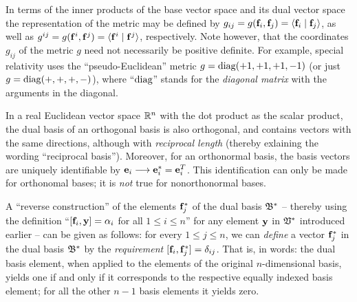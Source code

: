 In terms of the inner products of the base vector space and its dual vector space the representation
of the metric
may be defined by
$g_{ij}=g({\bf f}_i,{\bf f}_j)=\langle {\bf f}_i\mid {\bf f}_j\rangle$,
as well as
$g^{ij}=g({\bf f}^i,{\bf f}^j) =\langle {\bf f}^i\mid {\bf f}^j\rangle$, respectively.
Note however, that the coordinates $g_{ij}$ of
the metric $g$ need not necessarily be positive definite.
For example,  special relativity uses the ``pseudo-Euclidean'' metric
 $g={\rm diag}(+1,+1,+1,-1)$ (or just $g={\rm diag}(+,+,+,-)$), where ``${\rm diag}$''
stands for the {\em diagonal matrix}
with the arguments in the diagonal.




In a real Euclidean vector space ${\Bbb R}^n$
with the dot product as the scalar product,
the dual basis of an orthogonal basis  is also orthogonal, and contains vectors with the same directions,
although with {\em reciprocal length} (thereby exlaining the wording ``reciprocal basis'').
Moreover, for an orthonormal basis, the basis vectors are uniquely identifiable by
${\bf e}_i \longrightarrow {\bf e}_i^* = {\bf e}_i^T$.
This identification can only be made for orthonomal bases; it is {\em not} true for nonorthonormal bases.



A ``reverse construction'' of the elements ${\bf f}_j^\ast $ of the dual basis ${\frak B}^\ast $
-- thereby using the definition ``$[{\bf f}_i,{\bf y}] = \alpha_i$
for all $1 \le i \le n$''
for any element ${\bf y}$ in ${\frak V}^\ast $ introduced earlier
--
can be given as follows:
for every $1\le j \le n$,
we can {\em define} a vector ${\bf f}_j^\ast $ in the dual basis ${\frak B}^\ast $
by the {\em requirement}   $[{\bf f}_i,{\bf f}_j^\ast ] = \delta_{ij}$.
That is, in words:
the dual basis element, when applied to the elements of the original $n$-dimensional basis,
yields one if and only if  it corresponds to the respective equally indexed basis element;
for all the other $n-1$ basis elements it yields zero.

